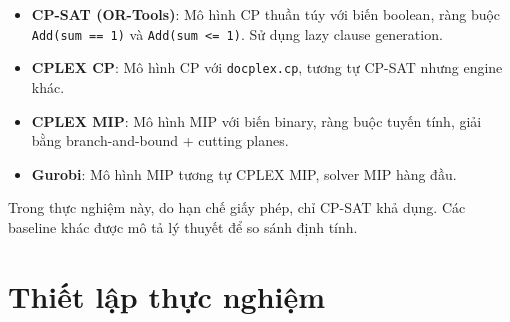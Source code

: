 \documentclass[a4paper,fleqn]{cas-sc}
\begin{document}
\begin{itemize}
    \item \textbf{CP-SAT (OR-Tools)}: Mô hình CP thuần túy với biến boolean, ràng buộc \texttt{Add(sum == 1)} và \texttt{Add(sum <= 1)}. Sử dụng lazy clause generation.
    \item \textbf{CPLEX CP}: Mô hình CP với \texttt{docplex.cp}, tương tự CP-SAT nhưng engine khác.
    \item \textbf{CPLEX MIP}: Mô hình MIP với biến binary, ràng buộc tuyến tính, giải bằng branch-and-bound + cutting planes.
    \item \textbf{Gurobi}: Mô hình MIP tương tự CPLEX MIP, solver MIP hàng đầu.
\end{itemize}

Trong thực nghiệm này, do hạn chế giấy phép, chỉ CP-SAT khả dụng. Các baseline khác được mô tả lý thuyết để so sánh định tính.

\section{Thiết lập thực nghiệm}
\label{sec:setup}
\end{document}
